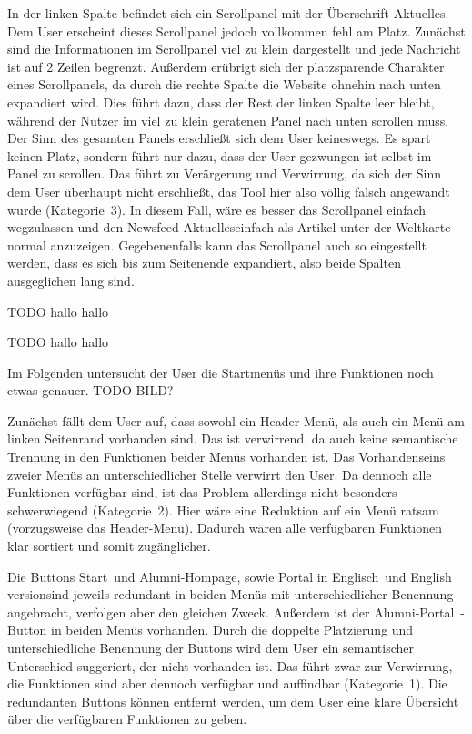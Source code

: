 {In der linken Spalte befindet sich ein Scrollpanel mit der Überschrift \glqq Aktuelles\grqq. Dem User erscheint dieses Scrollpanel jedoch vollkommen fehl am Platz.
Zunächst sind die Informationen im Scrollpanel viel zu klein dargestellt und jede Nachricht ist auf 2 Zeilen begrenzt. Außerdem erübrigt sich der platzsparende Charakter eines Scrollpanels, da durch die rechte Spalte die Website ohnehin nach unten expandiert wird. 
Dies führt dazu, dass der Rest der linken Spalte leer bleibt, während der Nutzer im viel zu klein geratenen Panel nach unten scrollen muss.
}{
Der Sinn des gesamten Panels erschließt sich dem User keineswegs. Es spart keinen Platz, sondern führt nur dazu, dass der User gezwungen ist selbst im Panel zu scrollen. Das führt zu Verärgerung und Verwirrung, da sich der Sinn dem User überhaupt nicht erschließt, das Tool hier also völlig falsch angewandt wurde (Kategorie~3).
}{
In diesem Fall, wäre es besser das Scrollpanel einfach wegzulassen und den Newsfeed \glqq Aktuelles\grqq einfach als Artikel unter der Weltkarte normal anzuzeigen. Gegebenenfalls kann das Scrollpanel auch so eingestellt werden, dass es sich bis zum Seitenende expandiert, also beide Spalten ausgeglichen lang sind. 
}

{TODO
}
{hallo
}
{hallo
}

{TODO
}
{hallo	
}
{hallo
}


Im Folgenden untersucht der User die Startmenüs und ihre Funktionen noch etwas genauer. TODO BILD?

{Zunächst fällt dem User auf, dass sowohl ein Header-Menü, als auch ein Menü am linken Seitenrand vorhanden sind. Das ist verwirrend, da auch keine semantische Trennung in den Funktionen beider Menüs vorhanden ist. 
}{Das Vorhandenseins zweier Menüs an unterschiedlicher Stelle verwirrt den User. Da dennoch alle Funktionen verfügbar sind, ist das Problem allerdings nicht besonders schwerwiegend (Kategorie~2).
}{Hier wäre eine Reduktion auf ein Menü ratsam (vorzugsweise das Header-Menü). Dadurch wären alle verfügbaren Funktionen klar sortiert und somit zugänglicher. 
}

{Die Buttons \glqq Start\grqq~und \glqq Alumni-Hompage\grqq, sowie \glqq Portal in Englisch\grqq~und \glqq English version\grqq sind jeweils redundant in beiden Menüs mit unterschiedlicher Benennung angebracht, verfolgen aber den gleichen Zweck. Außerdem ist der \glqq Alumni-Portal\grqq~-Button in beiden Menüs vorhanden.
}
{Durch die doppelte Platzierung und unterschiedliche Benennung der Buttons wird dem User ein semantischer Unterschied suggeriert, der nicht vorhanden ist. Das führt zwar zur Verwirrung, die Funktionen sind aber dennoch verfügbar und auffindbar (Kategorie~1).
}
{Die redundanten Buttons können entfernt werden, um dem User eine klare Übersicht über die verfügbaren Funktionen zu geben. 
}

